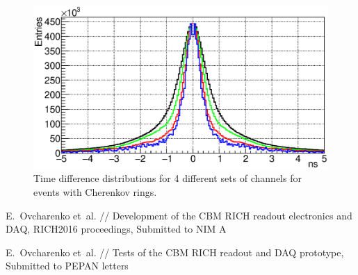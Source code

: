 \documentclass{JACoW-GSI-2015}
\begin{document}

\begin{figure}[tbh]
\centering
\includegraphics[width=0.9\linewidth]{../PTE/pictures/25_TimePrecision_evolution_rings_feb2017.eps}
\caption{Time difference distributions for 4 different sets of channels for events with Cherenkov rings.}
\label{fig:TimeResEvolutionRings}
\end{figure}

\begin{thebibliography}{9}

E.~Ovcharenko et~al. //
Development of the CBM RICH readout electronics and DAQ,
RICH2016 proceedings,
Submitted to NIM A

E.~Ovcharenko et~al. //
Tests of the CBM RICH readout and DAQ prototype,
Submitted to PEPAN letters

\end{thebibliography}
\end{document}
